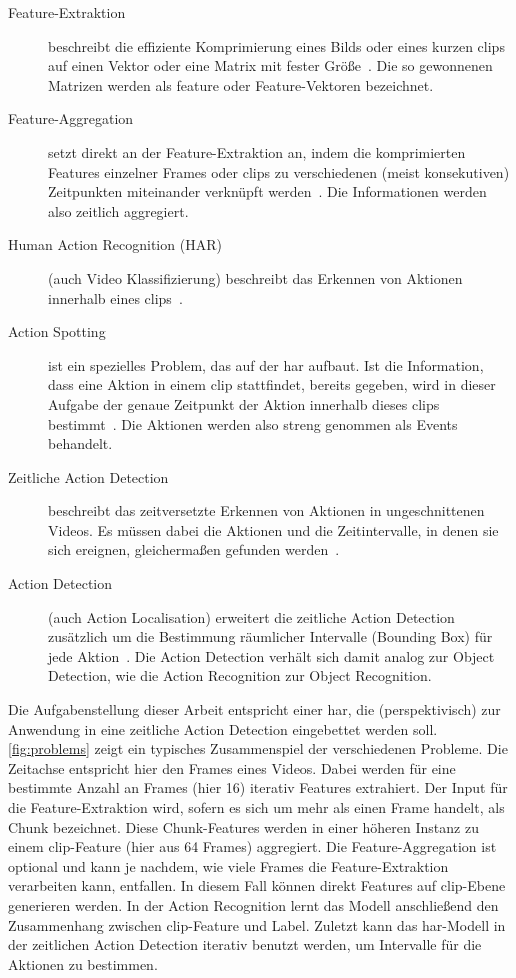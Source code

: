 \begin{description}
    \item[Feature-Extraktion]
    beschreibt die effiziente Komprimierung eines Bilds oder eines kurzen \glspl{clip} auf einen Vektor oder eine Matrix mit fester Größe~\cite{Tran14}.
    Die so gewonnenen Matrizen werden als \gls{feature} oder Feature-Vektoren bezeichnet.
    \item[Feature-Aggregation]
    setzt direkt an der Feature-Extraktion an, indem die komprimierten Features einzelner Frames oder \glspl{clip} zu verschiedenen (meist konsekutiven) Zeitpunkten miteinander verknüpft werden~\cite{Ng15}.
    Die Informationen werden also zeitlich aggregiert.
    \item[Human Action Recognition (HAR)]
    (auch Video Klassifizierung) beschreibt das Erkennen von Aktionen innerhalb eines \glspl{clip}~\cite{Rodriguez08}.
    \item[Action Spotting]
    ist ein spezielles Problem, das auf der \gls{har} aufbaut.
    Ist die Information, dass eine Aktion in einem \gls{clip} stattfindet, bereits gegeben, wird in dieser Aufgabe der genaue Zeitpunkt der Aktion innerhalb dieses \glspl{clip} bestimmt~\cite{Giancola18}.
    Die Aktionen werden also streng genommen als Events behandelt.
    \item[Zeitliche Action Detection]
    beschreibt das zeitversetzte Erkennen von Aktionen in ungeschnittenen Videos.
    Es müssen dabei die Aktionen und die Zeitintervalle, in denen sie sich ereignen, gleichermaßen gefunden werden~\cite{Xia20}.
    \item[Action Detection]
    (auch Action Localisation) erweitert die zeitliche Action Detection zusätzlich um die Bestimmung räumlicher Intervalle (Bounding Box) für jede Aktion~\cite{Xia20}.
    Die Action Detection verhält sich damit analog zur Object Detection, wie die Action Recognition zur Object Recognition.
\end{description}


Die Aufgabenstellung dieser Arbeit entspricht einer \gls{har}, die (perspektivisch) zur Anwendung in eine zeitliche Action Detection eingebettet werden soll.
\autoref{fig:problems} zeigt ein typisches Zusammenspiel der verschiedenen Probleme.
Die Zeitachse entspricht hier den Frames eines Videos.
Dabei werden für eine bestimmte Anzahl an Frames (hier 16) iterativ Features extrahiert.
Der Input für die Feature-Extraktion wird, sofern es sich um mehr als einen Frame handelt, als Chunk bezeichnet.
Diese Chunk-Features werden in einer höheren Instanz zu einem \gls{clip}-Feature (hier aus 64 Frames) aggregiert.
Die Feature-Aggregation ist optional und kann je nachdem, wie viele Frames die Feature-Extraktion verarbeiten kann, entfallen.
In diesem Fall können direkt Features auf \gls{clip}-Ebene generieren werden.
In der Action Recognition lernt das Modell anschließend den Zusammenhang zwischen \gls{clip}-Feature und Label.
Zuletzt kann das \gls{har}-Modell in der zeitlichen Action Detection iterativ benutzt werden, um Intervalle für die Aktionen zu bestimmen.

